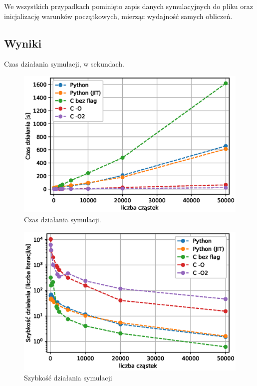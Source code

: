We wszystkich przypadkach pominięto zapis danych symulacyjnych do pliku oraz
inicjalizację warunków początkowych, mierząc wydajność samych obliczeń.

\subsection{Wyniki}

\begin{table}[H]
\centering
\footnotesize
\label{table:runtime}

\caption{Czas działania symulacji, w sekundach.}
\end{table}

\begin{figure}[h!]
  \includegraphics[width=\textwidth]{Images/runtimes}
  \caption{Czas działania symulacji.}\label{fig:runtime}
\end{figure}

\begin{figure}[h!]
  \includegraphics[width=\textwidth]{Images/speeds}
  \caption{Szybkość działania symulacji}\label{fig:runspeed}
\end{figure}
